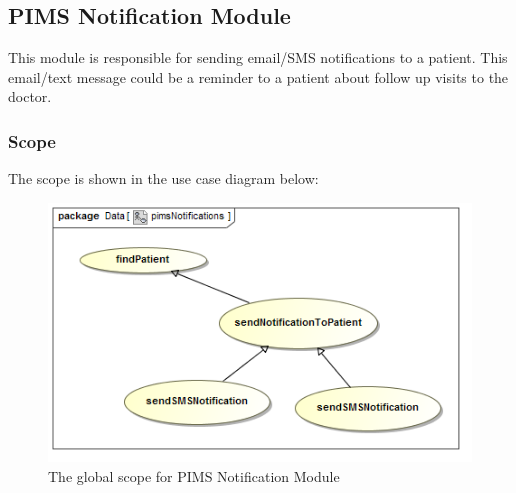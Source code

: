 \subsection{PIMS Notification Module}
This module is responsible for sending email/SMS notifications to a patient. This email/text message could be a reminder to a patient about follow up visits to the doctor. \par 

\subsubsection{Scope}
The scope is shown in the use case diagram below: \par
\begin{figure}[H]
	\centerline{\includegraphics[width=0.75\linewidth]{./Graphics/pimsNotification/pimsNotifications}}
	\caption{The global scope for PIMS Notification Module}
\end{figure}

